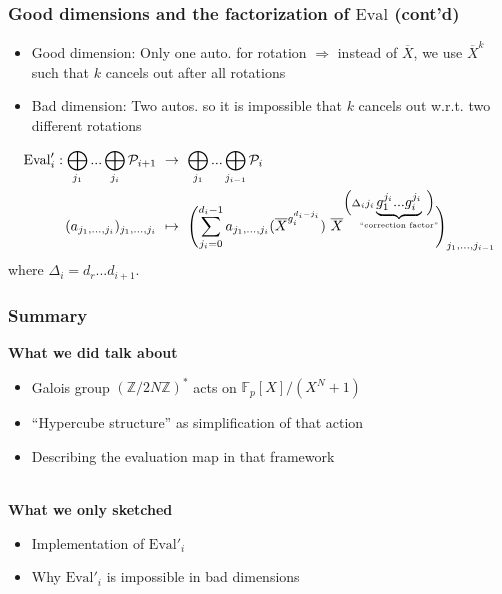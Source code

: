\documentclass{beamer}
\newcommand{\Z}{\mathbb{Z}}
\newcommand{\F}{\mathbb{F}}
\begin{document}
\begin{frame}
    \frametitle{Good dimensions and the factorization of $\mathrm{Eval}$ (cont'd)}

    \begin{itemize}
        \item Good dimension: Only one auto. for rotation $\Rightarrow$ instead of $\overline{X}$, we use $\overline{X}^k$ such that $k$ cancels out after all rotations
        \item Bad dimension: Two autos. so it is impossible that $k$ cancels out w.r.t. two different rotations
    \end{itemize}
    \begin{align*}
        \mathrm{Eval}'_i: \bigoplus_{j_1} ... \bigoplus_{j_i} \mathcal{P}_{i + 1} \ &\to \ \bigoplus_{j_1} ... \bigoplus_{j_{i - 1}} \mathcal{P}_i \\
        (a_{j_1, ..., j_i})_{j_1, ..., j_i} \ &\mapsto \ \Biggl( \sum_{j_i = 0}^{d_i - 1} a_{j_1, ..., j_i}(\overline{X}^{g_i^{d_i - j_i}}) \ \overline{X}^{\Bigl(\Delta_i j_i \underbrace{g_1^{j_i} ... g_i^{j_i}}_{\mathclap{\text{``correction factor''}}} \ \Bigr)} \Biggr)_{j_1, ..., j_{i - 1}}
    \end{align*}
    where $\Delta_i = d_r ... d_{i + 1}$.
\end{frame}

\begin{frame}
    \frametitle{Summary}

    \textbf{What we did talk about}
    \begin{itemize}
        \item Galois group $(\Z/2N\Z)^*$ acts on $\F_p[X]/(X^N + 1)$
        \item ``Hypercube structure'' as simplification of that action
        \item Describing the evaluation map in that framework
    \end{itemize}
    ~\\
    \textbf{What we only sketched}
    \begin{itemize}
        \item Implementation of $\mathrm{Eval}'_i$
        \item Why $\mathrm{Eval}'_i$ is impossible in bad dimensions
    \end{itemize}
\end{frame}
\end{document}

